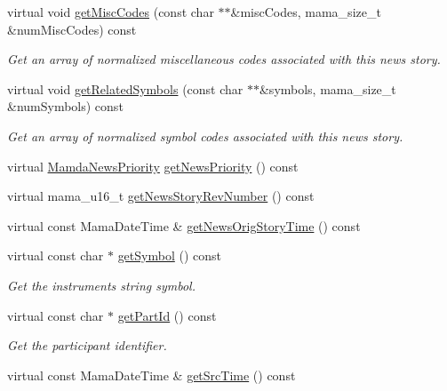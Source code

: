 \begin{CompactItemize}
virtual void \hyperlink{classWombat_1_1MamdaNewsHeadline_e072447d35b0890cd27e694f02859705}{get\-Misc\-Codes} (const char $\ast$$\ast$\&misc\-Codes, mama\_\-size\_\-t \&num\-Misc\-Codes) const 
\begin{CompactList}\small\item\em Get an array of normalized miscellaneous codes associated with this news story. \item\end{CompactList}\item 
virtual void \hyperlink{classWombat_1_1MamdaNewsHeadline_dfa06642c61fa25ebd63f55d587f54fe}{get\-Related\-Symbols} (const char $\ast$$\ast$\&symbols, mama\_\-size\_\-t \&num\-Symbols) const 
\begin{CompactList}\small\item\em Get an array of normalized symbol codes associated with this news story. \item\end{CompactList}\item 
virtual \hyperlink{namespaceWombat_faa7709d230f261c8aeb71420f6dd012}{Mamda\-News\-Priority} \hyperlink{classWombat_1_1MamdaNewsHeadline_716f900c705f9d4ee783bdb791779e68}{get\-News\-Priority} () const 
\item 
virtual mama\_\-u16\_\-t \hyperlink{classWombat_1_1MamdaNewsHeadline_75fde990077f814ccc4fb601de8a6d20}{get\-News\-Story\-Rev\-Number} () const 
\item 
virtual const Mama\-Date\-Time \& \hyperlink{classWombat_1_1MamdaNewsHeadline_a61ffab170f414fe6ffc986aec9c5ddb}{get\-News\-Orig\-Story\-Time} () const 
\item 
virtual const char $\ast$ \hyperlink{classWombat_1_1MamdaNewsHeadline_cad33340ee13c4bdcf9de234be19b0a5}{get\-Symbol} () const 
\begin{CompactList}\small\item\em Get the instruments string symbol. \item\end{CompactList}\item 
virtual const char $\ast$ \hyperlink{classWombat_1_1MamdaNewsHeadline_5c2e3274fa3d55033e98b2e2e45602d7}{get\-Part\-Id} () const 
\begin{CompactList}\small\item\em Get the participant identifier. \item\end{CompactList}\item 
virtual const Mama\-Date\-Time \& \hyperlink{classWombat_1_1MamdaNewsHeadline_e60a4e0f0d97fa42880b4def483b92f9}{get\-Src\-Time} () const 

\end{CompactItemize}
